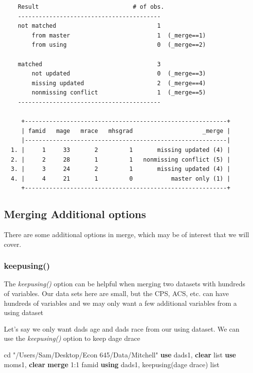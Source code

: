 \documentclass[
]{book}
\newenvironment{Shaded}{\begin{snugshade}}{\end{snugshade}}
\newcommand{\KeywordTok}[1]{\textcolor[rgb]{0.13,0.29,0.53}{\textbf{#1}}}
\newcommand{\NormalTok}[1]{#1}
\newcommand{\OtherTok}[1]{\textcolor[rgb]{0.56,0.35,0.01}{#1}}
\newcommand{\StringTok}[1]{\textcolor[rgb]{0.31,0.60,0.02}{#1}}
\begin{document}
\begin{verbatim}
    Result                           # of obs.
    -----------------------------------------
    not matched                             1
        from master                         1  (_merge==1)
        from using                          0  (_merge==2)

    matched                                 3
        not updated                         0  (_merge==3)
        missing updated                     2  (_merge==4)
        nonmissing conflict                 1  (_merge==5)
    -----------------------------------------

     +----------------------------------------------------------+
     | famid   mage   mrace   mhsgrad                    _merge |
     |----------------------------------------------------------|
  1. |     1     33       2         1       missing updated (4) |
  2. |     2     28       1         1   nonmissing conflict (5) |
  3. |     3     24       2         1       missing updated (4) |
  4. |     4     21       1         0           master only (1) |
     +----------------------------------------------------------+
\end{verbatim}

\subsection{Merging Additional options}\label{merging-additional-options}

There are some additional options in merge, which may be of interest that
we will cover.

\subsubsection*{keepusing()}\label{keepusing}

The \emph{keepusing()} option can be helpful when merging two datasets with hundreds of variables. Our data sets here are small, but the CPS, ACS, etc. can have hundreds of variables and we may only want a few additional variables from a using dataset

Let's say we only want dads age and dads race from our using dataset. We can use the \emph{keepusing()} option to keep dage drace

\begin{Shaded}
\begin{Highlighting}[]
\NormalTok{cd }\StringTok{"/Users/Sam/Desktop/Econ 645/Data/Mitchell"}
\KeywordTok{use}\NormalTok{ dads1, }\KeywordTok{clear}
\OtherTok{list}
\KeywordTok{use}\NormalTok{ moms1, }\KeywordTok{clear}
\KeywordTok{merge}\NormalTok{ 1:1 famid }\KeywordTok{using}\NormalTok{ dads1, keepusing(dage drace)}
\OtherTok{list}
\end{Highlighting}
\end{Shaded}
\end{document}
